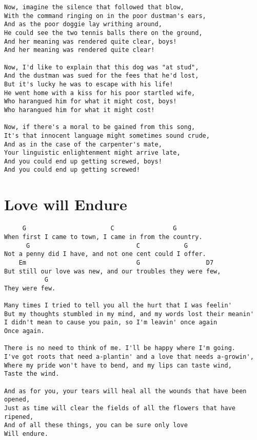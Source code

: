 \documentclass[leqno]{memoir}
\begin{document}
\begin{verbatim}
Now, imagine the silence that followed that blow,
With the command ringing on in the poor dustman's ears,
And as the poor doggie lay writhing around,
He could see the two tennis balls there on the ground,
And her meaning was rendered quite clear, boys!
And her meaning was rendered quite clear!

Now, I'd like to explain that this dog was "at stud",
And the dustman was sued for the fees that he'd lost,
But it's lucky he was to escape with his life!
He went home with a kiss for his poor startled wife,
Who harangued him for what it might cost, boys!
Who harangued him for what it might cost!

Now, if there's a moral to be gained from this song,
It's that innocent language might sometimes sound crude,
And as in the case of the carpenter's mate,
Your linguistic enlightenment might arrive late,
And you could end up getting screwed, boys!
And you could end up getting screwed! 
\end{verbatim}
\newpage

\chapter{Love will Endure}
\begin{verbatim}
     G                       C                G
When first I came to town, I came in from the country.
      G                             C            G
Not a penny did I have, and not one cent could I offer.
    Em                              G                  D7
But still our love was new, and our troubles they were few,
           G
They were few.

Many times I tried to tell you all the hurt that I was feelin'
But my thoughts stumbled in my mind, and my words lost their meanin'
I didn't mean to cause you pain, so I'm leavin' once again
Once again.

There is no need to think of me. I'll be happy where I'm going.
I've got roots that need a-plantin' and a love that needs a-growin',
Where my pride won't have to bend, and my lips can taste wind,
Taste the wind.

And as for you, your tears will heal all the wounds that have been opened,
Just as time will clear the fields of all the flowers that have ripened,
And of all these things, you can be sure only love
Will endure.

\end{verbatim}
\newpage
\end{document}
